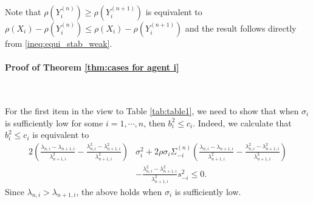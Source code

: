\documentclass[fleqn,mnsc,nonblindrev]{informs4}
\newcommand{\CE}{\operatorname{CE}}
\newcommand{\Var}{\operatorname{Var}}
\newcommand{\Cov}{\operatorname{Cov}}
\begin{document}
Note that $\rho(Y_i^{(n)})\geq\rho(Y_i^{(n+1)})$
is equivalent to
$\rho(X_i)-\rho(Y_i^{(n)})\leq\rho(X_i)-\rho(Y_i^{(n+1)})$
and the result follows directly from \eqref{ineq:equi_stab_weak}.



\paragraph{Proof of Theorem \ref{thm:cases for agent i}} 
\

For the first item in the view to Table \ref{tab:table1}, we need to show that when $\sigma_i$ is sufficiently low for some $i=1,\cdots,n$, then $b_i^2\leq c_i$. Indeed, we calculate that $b_i^2\leq c_i$ is equivalent to 
\begin{align*}
2\left(\frac{\lambda_{n,i}-\lambda_{n+1,i}}{\lambda_{n+1,i}^2} -\frac{\lambda_{n,i}^2-\lambda_{n+1,i}^2}{\lambda_{n+1,i}^2}\right) & \sigma^2_i
+2\rho\sigma_i\Sigma^{(n)}_{-i}\left(\frac{\lambda_{n,i}-\lambda_{n+1,i}}{\lambda_{n+1,i}^2}-\frac{\lambda_{n,i}^2-\lambda_{n+1,i}^2}{\lambda_{n+1,i}^2}\right)\\    
&-\frac{\lambda_{n,i}^2-\lambda_{n+1,i}^2}{\lambda_{n+1,i}^2}s^2_{-i}\leq 0.
\end{align*}
Since $\lambda_{n,i}>\lambda_{n+1,i}$, the above holds when $\sigma_i$ is sufficiently low. 
\end{document}

